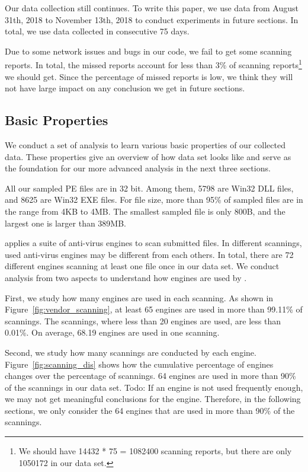 Our data collection still continues. 
To write this paper, we use data from August 31th, 2018 to 
November 13th, 2018 to conduct experiments in future sections. 
In total, we use data collected in consecutive 75 days. 

Due to some network issues and bugs in our code, 
we fail to get some scanning reports. 
In total, the missed reports account for less than 3\% 
of scanning reports\footnote{We should have 14432 * 75 = 1082400 scanning reports, but there are only 1050172 in our data set.}
we should get. 
Since the percentage of missed reports is low, 
we think they will not have large impact on any 
conclusion we get in future sections. 


\subsection{Basic Properties}

We conduct a set of analysis 
to learn various basic properties of our collected data.
These properties give an overview of how data set looks like
and serve as the foundation for our more 
advanced analysis in the next three sections. 

All our sampled PE files are in 32 bit. 
Among them, 5798 are Win32 DLL files, 
and 8625 are Win32 EXE files.
For file size, more than 95\% of sampled files are 
in the range from 4KB to 4MB. 
The smallest sampled file is only 800B, 
and the largest one is larger than 389MB.

\vt{} applies a suite of anti-virus engines to scan submitted files.
In different scannings, used anti-virus engines may be different 
from each others. 
In total, there are 72 different engines scanning 
at least one file once in our data set. 
We conduct analysis from two aspects to 
understand how engines are used by \vt{}.



First, we study how many engines are used in each scanning. 
As shown in Figure~\ref{fig:vendor_scanning}, 
at least 65 engines are used in more 
than 99.11\% of scannings. 
The scannings, where less than 20 engines are used, 
are less than 0.01\%.
On average, 68.19 engines are used in one scanning. 

Second, we study how many scannings are conducted by each engine. 
Figure~\ref{fig:scanning_dis} shows how the cumulative percentage of engines changes 
over the percentage of scannings. 
64 engines are used in more than 90\% of 
the scannings in our data set. 
{\color{red} Todo: If an engine is not used frequently enough, 
we may not get meaningful conclusions for the engine. 
Therefore, in the following sections, 
we only consider the 64 engines that are used in more than 90\% of the scannings.}

